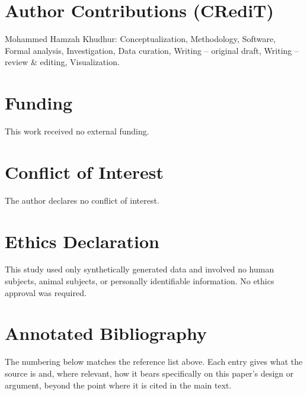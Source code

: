 \documentclass[11pt]{article}
\begin{document}
\section*{Author Contributions (CRediT)}
Mohammed Hamzah Khudhur: Conceptualization, Methodology, Software, Formal analysis, Investigation, Data curation, Writing -- original draft, Writing -- review \& editing, Visualization.

\section*{Funding}
This work received no external funding.

\section*{Conflict of Interest}
The author declares no conflict of interest.

\section*{Ethics Declaration}
This study used only synthetically generated data and involved no human subjects, animal subjects, or personally identifiable information. No ethics approval was required.




\section*{Annotated Bibliography}
\small
The numbering below matches the reference list above. Each entry gives what the source is and, where relevant, how it bears specifically on this paper's design or argument, beyond the point where it is cited in the main text.
\end{document}
